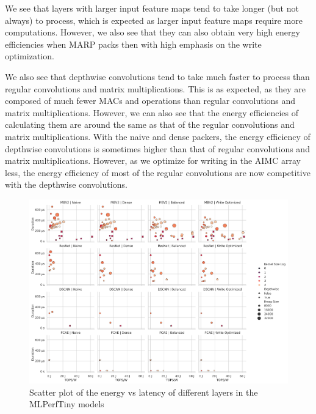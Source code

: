 We see that layers with larger input feature maps tend to take longer (but not always) to process, which is expected as larger input feature maps require more computations. However, we also see that they can also obtain very high energy efficiencies when MARP packs then with high emphasis on the write optimization. 

We also see that depthwise convolutions tend to take much faster to process than regular convolutions and matrix multiplications. This is as expected, as they are composed of much fewer MACs and operations than regular convolutions and matrix multiplications. However, we can also see that the energy efficiencies of calculating them are around the same as that of the regular convolutions and matrix multiplications. With the naive and dense packers, the energy efficiency of depthwise convolutions is sometimes higher than that of regular convolutions and matrix multiplications. However, as we optimize for writing in the AIMC array less, the energy efficiency of most of the regular convolutions are now competitive with the depthwise convolutions.

\begin{figure}[htbp]
    \centering
    \includegraphics[width=\textwidth]{images/marp_qracc/duration_tops_scatter.png}
    \caption{Scatter plot of the energy vs latency of different layers in the MLPerfTiny models}
    \label{fig:duration_tops_scatter}
\end{figure}


